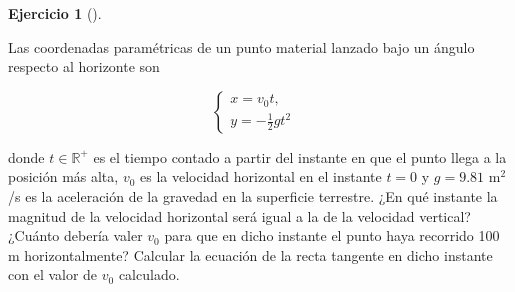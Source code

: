 \documentclass[
  spanish,
  a4paper,
]{scrreport}
\theoremstyle{definition}
\newtheorem{exercise}{Ejercicio}[chapter]
\theoremstyle{remark}
\begin{document}
\begin{exercise}[]\protect\hypertarget{exr-trayectorias-2}{}\label{exr-trayectorias-2}

Las coordenadas paramétricas de un punto material lanzado bajo un ángulo
respecto al horizonte son

\[
\begin{cases}
x=v_0t, & \\
y=-\frac{1}{2}gt^2
\end{cases}
\]

donde \(t\in \mathbb{R}^{+}\) es el tiempo contado a partir del instante
en que el punto llega a la posición más alta, \(v_0\) es la velocidad
horizontal en el instante \(t=0\) y \(g=9.81\) m\(^2\)/s es la
aceleración de la gravedad en la superficie terrestre. ¿En qué instante
la magnitud de la velocidad horizontal será igual a la de la velocidad
vertical? ¿Cuánto debería valer \(v_0\) para que en dicho instante el
punto haya recorrido 100 m horizontalmente? Calcular la ecuación de la
recta tangente en dicho instante con el valor de \(v_0\) calculado.

\end{exercise}
\end{document}
